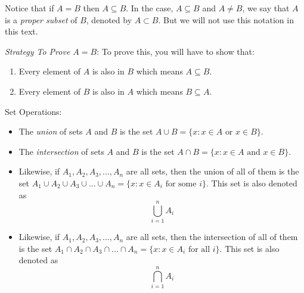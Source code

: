 Notice that if $A = B$ then $A \subseteq B$. In the case, $A \subseteq B$ and $A \neq B$, we say that $A$ is a \emph{proper subset} of $B$, denoted by $A \subset B$. But we will not use this notation in this text.

\break
\emph{Strategy To Prove $A = B$}: To prove this, you will have to show that:
\begin{enumerate}
	\item Every element of $A$ is also in $B$ which means $A \subseteq B$.
	\item Every element of $B$ is also in $A$ which means $B \subseteq A$.
\end{enumerate}

\begin{definition}
	Set Operations:
	\begin{itemize}
		\item The \emph{union} of sets $A$ and $B$ is the set $A \cup B = \{ x : x \in A \text{ or } x \in B \}$.

		\item The \emph{intersection} of sets $A$ and $B$ is the set $A \cap B = \{ x : x \in A \text{ and } x \in B \}$.

		\item Likewise, if $A_1, A_2, A_3, ..., A_n$ are all sets, then the union of all of them is the set 
			$A_1 \cup A_2 \cup A_3 \cup ... \cup A_n = \{ x : x \in A_i \text{ for some } i \}$. 
			This set is also denoted as $$\bigcup_{i=1}^{n} A_i$$

		\item Likewise, if $A_1, A_2, A_3, ..., A_n$ are all sets, then the intersection of all of them is the set 
			$A_1 \cap A_2 \cap A_3 \cap ... \cap A_n = \{ x : x \in A_i \text{ for all } i \}$. 
			This set is also denoted as $$\bigcap_{i=1}^{n} A_i$$
	\end{itemize}
\end{definition}
